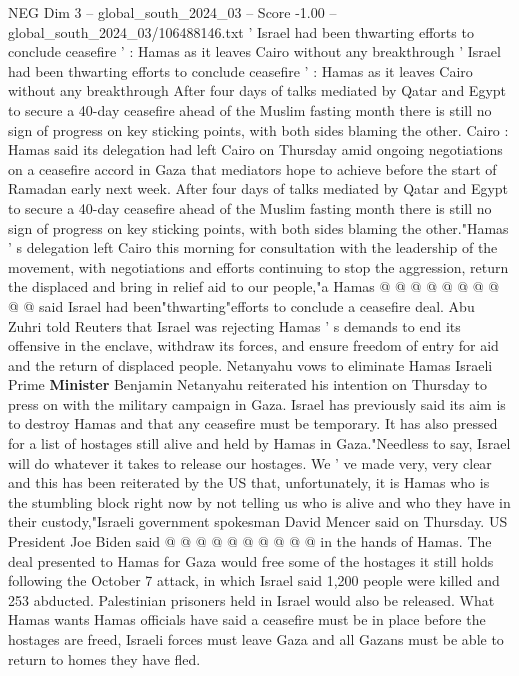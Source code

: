 \begin{textsample}{NEG Dim 3 – global\_south\_2024\_03 – Score -1.00 – global\_south\_2024\_03/106488146.txt}  \label{ex:f3_neg_048}
' Israel had been thwarting efforts to conclude ceasefire ' : Hamas as it leaves Cairo without any breakthrough ' Israel had been thwarting efforts to conclude ceasefire ' : Hamas as it leaves Cairo without any breakthrough After four days of talks mediated by Qatar and Egypt to secure a 40-day ceasefire ahead of the Muslim fasting month there is still no sign of progress on key sticking points, with both sides blaming the other.
Cairo : Hamas said its delegation had left Cairo on Thursday amid ongoing negotiations on a ceasefire accord in Gaza that mediators hope to achieve before the start of Ramadan early next week.
After four days of talks mediated by Qatar and Egypt to secure a 40-day ceasefire ahead of the Muslim fasting month there is still no sign of progress on key sticking points, with both sides blaming the other."Hamas ' s delegation left Cairo this morning for consultation with the leadership of the movement, with negotiations and efforts continuing to stop the aggression, return the displaced and bring in relief aid to our people,"a Hamas @ @ @ @ @ @ @ @ @ @ said Israel had been"thwarting"efforts to conclude a ceasefire deal.
Abu Zuhri told Reuters that Israel was rejecting Hamas ' s demands to end its offensive in the enclave, withdraw its forces, and ensure freedom of entry for aid and the return of displaced people.
Netanyahu vows to eliminate Hamas Israeli Prime \textbf{Minister} Benjamin Netanyahu reiterated his intention on Thursday to press on with the military campaign in Gaza.
Israel has previously said its aim is to destroy Hamas and that any ceasefire must be temporary.
It has also pressed for a list of hostages still alive and held by Hamas in Gaza."Needless to say, Israel will do whatever it takes to release our hostages.
We ' ve made very, very clear and this has been reiterated by the US that, unfortunately, it is Hamas who is the stumbling block right now by not telling us who is alive and who they have in their custody,"Israeli government spokesman David Mencer said on Thursday.
US President Joe Biden said @ @ @ @ @ @ @ @ @ @ in the hands of Hamas.
The deal presented to Hamas for Gaza would free some of the hostages it still holds following the October 7 attack, in which Israel said 1,200 people were killed and 253 abducted.
Palestinian prisoners held in Israel would also be released.
What Hamas wants Hamas officials have said a ceasefire must be in place before the hostages are freed, Israeli forces must leave Gaza and all Gazans must be able to return to homes they have fled.

\end{textsample}
